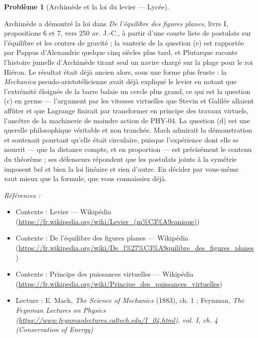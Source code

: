 \documentclass[11pt]{article}
\newtheorem{problem}{Problème}
\newenvironment{refs}{\par\small\noindent\emph{Références :}\begin{itemize}\setlength\itemsep{0pt}}{\end{itemize}\normalsize}
\begin{document}
\begin{problem}[{Archimède et la loi du levier --- Lycée}]
\end{problem}

\noindent Archimède a démontré la loi dans \textit{De l'équilibre des figures planes}, livre I,
propositions 6 et 7, vers 250 av. J.-C., à partir d'une courte liste de postulats sur l'équilibre et
les centres de gravité ; la vanterie de la question (e) est rapportée par Pappus d'Alexandrie quelque
cinq siècles plus tard, et Plutarque raconte l'histoire jumelle d'Archimède tirant seul un navire
chargé sur la plage pour le roi Hiéron. Le résultat était déjà ancien alors, sous une forme plus
fruste : la \textit{Mechanica} pseudo-aristotélicienne avait déjà expliqué le levier en notant que
l'extrémité éloignée de la barre balaie un cercle plus grand, ce qui est la question (c) en germe ---
l'argument par les vitesses virtuelles que Stevin et Galilée allaient affûter et que Lagrange
finirait par transformer en principe des travaux virtuels, l'ancêtre de la machinerie de moindre
action de PHY-04. La question (d) est une querelle philosophique véritable et non tranchée. Mach
admirait la démonstration et soutenait pourtant qu'elle était circulaire, puisque l'expérience dont
elle se nourrit --- que la distance compte, et en proportion --- est précisément le contenu du théorème ;
ses défenseurs répondent que les postulats joints à la symétrie imposent bel et bien la loi linéaire
et rien d'autre. En décider par vous-même vaut mieux que la formule, que vous connaissiez déjà.

\begin{refs}
\item Contexte : Levier --- Wikipédia (\url{https://fr.wikipedia.org/wiki/Levier_(m%C3%A9canique)})
\item Contexte : De l'équilibre des figures planes --- Wikipédia (\url{https://fr.wikipedia.org/wiki/De_l%27%C3%A9quilibre_des_figures_planes})
\item Contexte : Principe des puissances virtuelles --- Wikipédia (\url{https://fr.wikipedia.org/wiki/Principe_des_puissances_virtuelles})
\item Lecture : E. Mach, \textit{The Science of Mechanics} (1883), ch. 1 ; Feynman, \textit{The Feynman Lectures on Physics (\url{https://www.feynmanlectures.caltech.edu/I_04.html}), vol. I, ch. 4 (Conservation of Energy)}
\end{refs}

\bigskip
\end{document}
